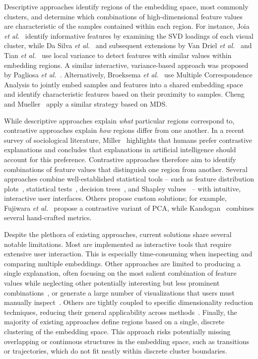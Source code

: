 \documentclass[lettersize,journal]{IEEEtran}
\newcommand{\etal}{\textit{et al.\xspace}}
\begin{document}
Descriptive approaches identify regions of the embedding space, most commonly clusters, and determine which combinations of high-dimensional feature values are characteristic of the samples contained within each region.
For instance, Joia \etal~\cite{Joia2015} identify informative features by examining the SVD loadings of each visual cluster, while Da Silva \etal~\cite{DaSilva2015} and subsequent extensions by Van Driel \etal~\cite{VanDriel2020} and Tian \etal~\cite{Tian2021} use local variance to detect features with similar values within embedding regions.
A similar interactive, variance-based approach was proposed by Pagliosa \etal~\cite{Pagliosa2016}.
Alternatively, Broeksema \etal~\cite{Broeksema2013} use Multiple Correspondence Analysis to jointly embed samples and features into a shared embedding space and identify characteristic features based on their proximity to samples. Cheng and Mueller~\cite{ChengMueller2016} apply a similar strategy based on MDS.

While descriptive approaches explain \textit{what} particular regions correspond to, contrastive approaches explain \textit{how} regions differ from one another. In a recent survey of sociological literature, Miller~\cite{Miller2019} highlights that humans prefer contrastive explanations and concludes that explanations in artificial intelligence should account for this preference.
Contrastive approaches therefore aim to identify combinations of feature values that distinguish one region from another.
Several approaches combine well-established statistical tools -- such as feature distribution plots~\cite{Stahnke2016,Eckelt2022}, statistical tests~\cite{Marcilio2021}, decision trees~\cite{Bibal2021}, and Shapley values~\cite{MarcilioEler2021} -- with intuitive, interactive user interfaces.
Others propose custom solutions; for example, Fujiwara \etal~\cite{Fujiwara2020} propose a contrastive variant of PCA, while Kandogan~\cite{Kandogan2012} combines several hand-crafted metrics.

Despite the plethora of existing approaches, current solutions share several notable limitations. Most are implemented as interactive tools that require extensive user interaction. This is especially time-consuming when inspecting and comparing multiple embeddings.
Other approaches are limited to producing a single explanation, often focusing on the most salient combination of feature values while neglecting other potentially interesting but less prominent combinations~\cite{DaSilva2015,VanDriel2020,Tian2021}, or generate a large number of visualizations that users must manually inspect~\cite{Faust2019,Plumb2020}.
Others are tightly coupled to specific dimensionality reduction techniques, reducing their general applicability across methods~\cite{Chatzimparmpas2020,Broeksema2013,ChengMueller2016}. Finally, the majority of existing approaches define regions based on a single, discrete clustering of the embedding space. This approach risks potentially missing overlapping or continuous structures in the embedding space, such as transitions or trajectories, which do not fit neatly within discrete cluster boundaries.
\end{document}
